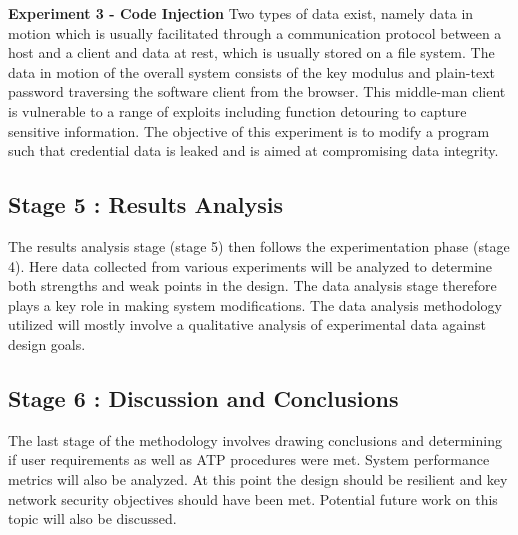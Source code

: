 \textbf{Experiment 3 - Code Injection}
Two types of data exist, namely data in motion which is usually facilitated through a communication protocol between a host and a client and data at rest, which is usually stored on a file system. The data in motion of the overall system consists of the key modulus and plain-text password traversing the software client from the browser. This middle-man client is vulnerable to a range of exploits including function detouring to capture sensitive information. The objective of this experiment is to modify a program such that credential data is leaked and is aimed at compromising data integrity.

\subsection{Stage 5 : Results Analysis}
The results analysis stage (stage 5) then follows the experimentation phase (stage 4). Here data collected from various experiments will be analyzed to determine both strengths and weak points in the design. The data analysis stage therefore plays a key role in making system modifications. The data analysis methodology utilized will mostly involve a qualitative analysis of experimental data against design goals.

\subsection{Stage 6 : Discussion and Conclusions}
The last stage of the methodology involves drawing conclusions and determining if user requirements as well as ATP procedures were met. System performance metrics will also be analyzed. At this point the design should be resilient and key network security objectives should have been met. Potential future work on this topic will also be discussed.


